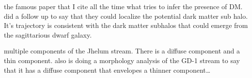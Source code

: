     \citet{2019ApJ...880...38B} the famous paper that I cite all the time what tries to infer the presence of DM. \citet{2020ApJ...892L..37B} did a follow up to say that they could localize the potential dark matter sub halo. It's trajectory is consistent with the dark matter subhalos that could emerge from the sagittarious dwarf galaxy.

    \citet{2019ApJ...881L..37B} multiple components of the Jhelum stream. There is a diffuse component and a thin component. \citet{2019ApJ...881..106M} also is doing a morphology analysis of the GD-1 stream to say that it has a diffuse component that envelopes a thinner component\dots 

